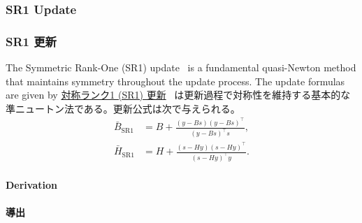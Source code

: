 \documentclass[0_main]{subfiles}
\begin{document}
\ifEn
    \subsubsection{SR1 Update}
\else
    \subsubsection{SR1 更新}
\fi

\ifEn
    The Symmetric Rank-One (SR1) update~\citep{nocedal1999numerical} is a fundamental quasi-Newton method that maintains symmetry throughout the update process. The update formulas are given by
\else
    \href{https://en.wikipedia.org/wiki/Symmetric_rank-one}{対称ランク1 (SR1) 更新}~\citep{nocedal1999numerical} は更新過程で対称性を維持する基本的な準ニュートン法である。更新公式は次で与えられる。
\fi
\begin{align*}
    \bar{B}_{\mathrm{SR1}} & = B + \frac{(y - B s)(y - B s)^\top}{(y - B s)^\top s}, \\
    \bar{H}_{\mathrm{SR1}} & = H + \frac{(s - H y)(s - H y)^\top}{(s - H y)^\top y}.
\end{align*}

\ifEn
    \paragraph{Derivation}
\else
    \paragraph{導出}
\fi
\end{document}
